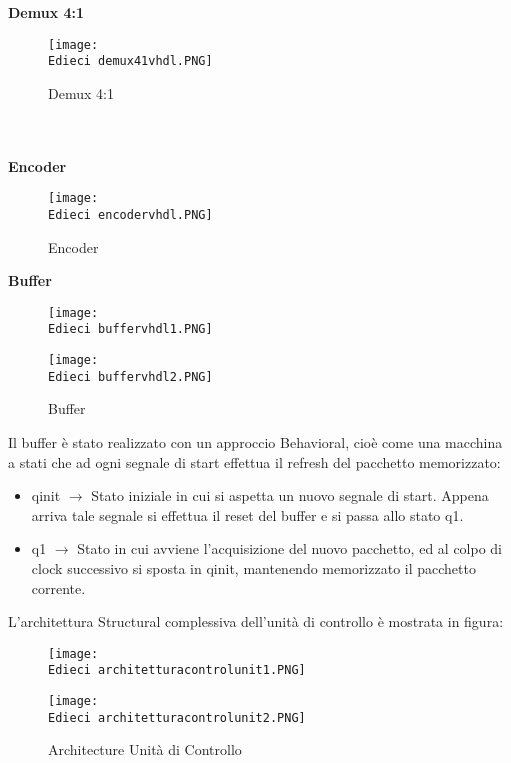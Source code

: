 \documentclass[12pt]{article}
\def \Edieci {Allegati/Esercizio10/}
\begin{document}
\clearpage
{\large \textbf{Demux 4:1}}
\begin{figure}[ht!]
    \centering
    \texttt{[image: \\Edieci demux41vhdl.PNG]}
    \caption{Demux 4:1}
\end{figure}
\\\\{\large \textbf{Encoder}}
\begin{figure}[ht!]
    \centering
    \texttt{[image: \\Edieci encodervhdl.PNG]}
    \caption{Encoder}
\end{figure}
\clearpage
{\large \textbf{Buffer}}
\begin{figure}[ht!]
    \texttt{[image: \\Edieci buffervhdl1.PNG]}
\end{figure}
\begin{figure}[ht!]
    \texttt{[image: \\Edieci buffervhdl2.PNG]}
    \caption{Buffer}
\end{figure}
\newpage
Il buffer è stato realizzato con un approccio Behavioral, cioè come una macchina a stati che ad ogni segnale di start effettua il refresh del pacchetto memorizzato:
\begin{itemize}
    \item qinit $\rightarrow$ Stato iniziale in cui si aspetta un nuovo segnale di start. Appena arriva tale segnale si effettua il reset del buffer e si passa allo stato q1.
    \item q1 $\rightarrow$ Stato in cui avviene l’acquisizione del nuovo pacchetto, ed al colpo di clock successivo si sposta in qinit, mantenendo memorizzato il pacchetto corrente.
\end{itemize}
L’architettura Structural complessiva dell’unità di controllo è mostrata in figura:
\begin{figure}[ht!]
    \centering
    \texttt{[image: \\Edieci architetturacontrolunit1.PNG]}
\end{figure}
\begin{figure}[ht!]
    \centering
    \texttt{[image: \\Edieci architetturacontrolunit2.PNG]}
    \caption{Architecture Unità di Controllo}
\end{figure}
\clearpage
\end{document}
